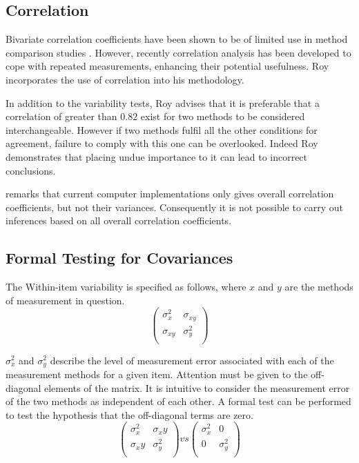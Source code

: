 \documentclass[12pt, a4paper]{report}
\theoremstyle{plain}
\theoremstyle{definition}
\theoremstyle{remark}
\begin{document}
			
			
			
			
			
			
			
			
			
			
			\subsection{Correlation}	
			Bivariate correlation coefficients have been shown to be of
			limited use in method comparison studies \citep{BA86}. However,
			recently correlation analysis has been developed to cope with
			repeated measurements, enhancing their potential usefulness. Roy
			incorporates the use of correlation into his methodology.
			
			
			In addition to the variability tests, Roy advises that it is preferable that a correlation of greater than $0.82$ exist for two methods to be considered interchangeable. However if two methods fulfil all the other conditions for agreement, failure to comply with this one can be overlooked. Indeed Roy demonstrates that placing undue importance to it can lead to incorrect conclusions. 
			
			\citet{ARoy2009} remarks that current computer implementations only gives overall correlation coefficients, but not their variances. Consequently it is not possible to carry out inferences based on all overall correlation coefficients.
			\subsection{Formal Testing for Covariances} %
			
			The Within-item variability is specified as follows, where $x$ and $y$ are the methods of measurement in question.
			\[ \left(
			\begin{array}{cc}
			\sigma^2_x & \sigma_{xy} \\
			\sigma_{xy} & \sigma^2_y \\
			\end{array}
			\right)
			\]
			
			$\sigma^2_x$ and $\sigma^2_y$ describe the level of measurement error associated with each of the measurement methods for a given item. Attention must be given to the off-diagonal elements of the matrix. It is intuitive to consider the measurement error of the two methods as independent of each other. A formal test can be performed to test the hypothesis that the off-diagonal terms are zero.
			\[ \left(
			\begin{array}{cc}
			\sigma^2_x & \sigma_xy \\
			\sigma_xy & \sigma^2_y \\
			\end{array}
			\right) vs \left(
			\begin{array}{cc}
			\sigma^2_x & 0 \\
			0 & \sigma^2_y \\
			\end{array}
			\right)
			\]
			
\end{document}
